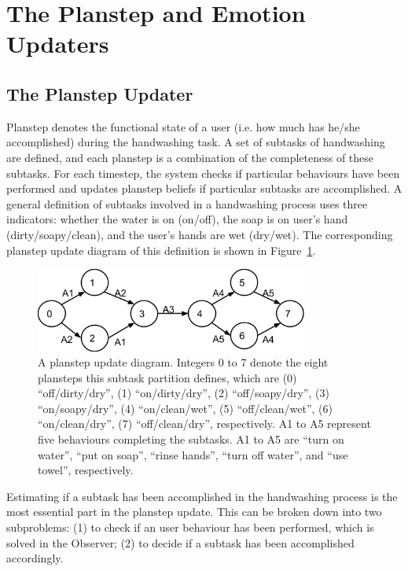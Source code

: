 \section{The Planstep and Emotion Updaters}
\subsection{The Planstep Updater}

Planstep denotes the functional state of a user (i.e. how much has he/she accomplished) during the handwashing task. A set of subtasks of handwashing are defined, and each planstep is a combination of the completeness of these subtasks. For each timestep, the system checks if particular behaviours have been performed and updates planstep beliefs if particular subtasks are accomplished. A general definition of subtasks involved in a handwashing process uses three indicators: whether the water is on (on/off), the soap is on user's hand (dirty/soapy/clean), and the user's hands are wet (dry/wet). The corresponding planstep update diagram of this definition is shown in Figure~\ref{fig:planstep}.

\begin{figure}[h!]
\centering
\includegraphics[width=0.8\textwidth]{fig/planstep.png}
\caption{A planstep update diagram. Integers 0 to 7 denote the eight plansteps this subtask partition defines, which are (0) ``off/dirty/dry'', (1) ``on/dirty/dry'', (2) ``off/soapy/dry'', (3) ``on/soapy/dry'', (4) ``on/clean/wet'', (5) ``off/clean/wet'', (6) ``on/clean/dry'', (7) ``off/clean/dry'', respectively. A1 to A5 represent five behaviours completing the subtasks. A1 to A5 are ``turn on water'', ``put on soap'', ``rinse hands'', ``turn off water'', and ``use towel'', respectively.}
\label{fig:planstep}
\end{figure}

Estimating if a subtask has been accomplished in the handwashing process is the most essential part in the planstep update. This can be broken down into two subproblems: (1) to check if an user behaviour has been performed, which is solved in the Observer; (2) to decide if a subtask has been accomplished accordingly.

